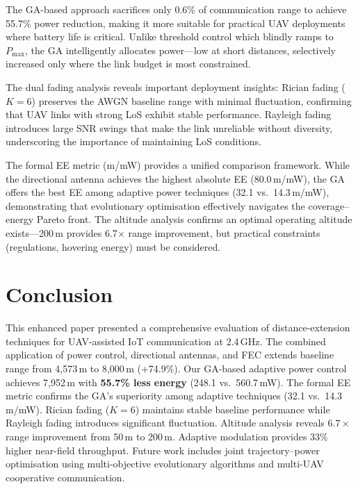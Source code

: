 \documentclass[conference]{IEEEtran}
\begin{document}
The GA-based approach sacrifices only 0.6\% of communication range to achieve 55.7\% power reduction, making it more suitable for practical UAV deployments where battery life is critical. Unlike threshold control which blindly ramps to $P_\text{max}$, the GA intelligently allocates power---low at short distances, selectively increased only where the link budget is most constrained.

The dual fading analysis reveals important deployment insights: Rician fading ($K\!=\!6$) preserves the AWGN baseline range with minimal fluctuation, confirming that UAV links with strong LoS exhibit stable performance. Rayleigh fading introduces large SNR swings that make the link unreliable without diversity, underscoring the importance of maintaining LoS conditions.

The formal EE metric (m/mW) provides a unified comparison framework. While the directional antenna achieves the highest absolute EE (80.0\,m/mW), the GA offers the best EE among adaptive power techniques (32.1 vs.\ 14.3\,m/mW), demonstrating that evolutionary optimisation effectively navigates the coverage--energy Pareto front. The altitude analysis confirms an optimal operating altitude exists---200\,m provides 6.7$\times$ range improvement, but practical constraints (regulations, hovering energy) must be considered.

\section{Conclusion}

This enhanced paper presented a comprehensive evaluation of distance-extension techniques for UAV-assisted IoT communication at 2.4\,GHz. The combined application of power control, directional antennas, and FEC extends baseline range from 4,573\,m to 8,000\,m (+74.9\%). Our GA-based adaptive power control achieves 7,952\,m with \textbf{55.7\% less energy} (248.1 vs.\ 560.7\,mW). The formal EE metric confirms the GA's superiority among adaptive techniques (32.1 vs.\ 14.3\,m/mW). Rician fading ($K\!=\!6$) maintains stable baseline performance while Rayleigh fading introduces significant fluctuation. Altitude analysis reveals $6.7\times$ range improvement from 50\,m to 200\,m. Adaptive modulation provides 33\% higher near-field throughput. Future work includes joint trajectory--power optimisation using multi-objective evolutionary algorithms and multi-UAV cooperative communication.
\end{document}
